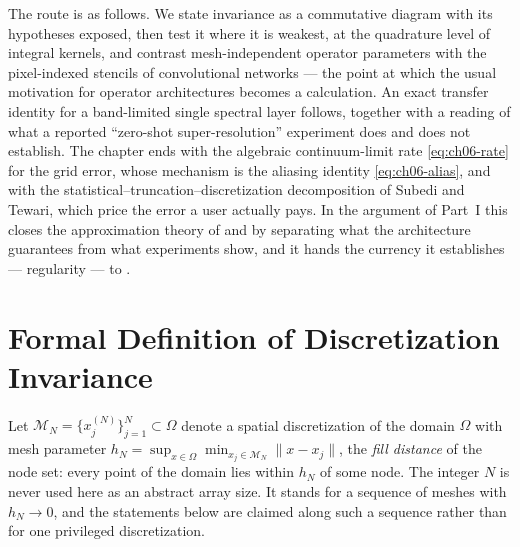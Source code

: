 The route is as follows. We state invariance as a commutative diagram with its
hypotheses exposed, then test it where it is weakest, at the quadrature level of
integral kernels, and contrast mesh-independent operator parameters with the
pixel-indexed stencils of convolutional networks --- the point at which the
usual motivation for operator architectures becomes a calculation. An exact
transfer identity for a band-limited single spectral layer follows, together
with a reading of what a reported
``zero-shot super-resolution'' experiment does
and does not establish. The chapter ends with the algebraic continuum-limit
rate \eqref{eq:ch06-rate} for the grid error, whose mechanism is the aliasing
identity \eqref{eq:ch06-alias}, and with the
statistical--truncation--discretization decomposition of Subedi and Tewari,
which price the error a user actually pays. In the argument of Part~I this
closes the approximation theory of
 and
 by separating what
the architecture guarantees from what experiments show, and it hands the
currency it establishes --- regularity --- to
.

\section{Formal Definition of Discretization Invariance}
\label{sec:ch06-definition}

Let $\mathcal{M}_N = \{x_j^{(N)}\}_{j=1}^N \subset \Omega$ denote a spatial
discretization of the domain $\Omega$ with mesh parameter
$h_N = \sup_{x \in \Omega} \min_{x_j \in \mathcal{M}_N} \|x - x_j\|$, the
\emph{fill distance} of
the node set: every point of the domain lies within $h_N$ of some node. The
integer $N$ is never used here as an abstract array size. It stands for a
sequence of meshes with $h_N \to 0$, and the statements below are claimed along
such a sequence rather than for one privileged discretization.

